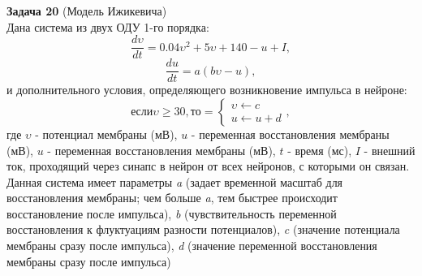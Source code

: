 \indent \textbf{Задача 20} (Модель Ижикевича) \\
Дана система из двух ОДУ 1-го порядка:
\begin{equation}
    \frac{d\upsilon}{dt} = 0.04\upsilon^2 + 5\upsilon + 140 - u + I,
\end{equation}
\begin{equation}
    \frac{du}{dt} = a(b\upsilon - u),
\end{equation}
и дополнительного условия, определяющего возникновение импульса в нейроне:
\begin{equation}
если \upsilon \geq 30, то = 
 \begin{cases}
   \upsilon \leftarrow c\\ 
   u \leftarrow u+d
 \end{cases} ,
\end{equation}
где $\upsilon$ - потенциал мембраны (мВ), $u$ - переменная восстановления мембраны (мВ), $u$ - переменная восстановления мембраны (мВ), $t$ - время (мс), $I$ - внешний ток, проходящий через синапс в нейрон от всех нейронов, с которыми он связан. Данная система имеет параметры \textit{a} (задает временной масштаб для восстановления мембраны; чем больше \textit{a}, тем быстрее происходит восстановление после импульса), \textit{b} (чувствительность переменной восстановления к флуктуациям разности потенциалов), \textit{c} (значение потенциала мембраны сразу после импульса), \textit{d} (значение переменной восстановления мембраны сразу после импульса) 
\clearpage
